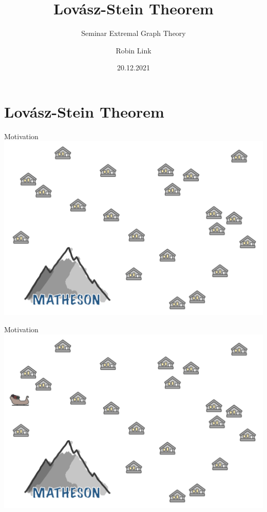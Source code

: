 \documentclass[10pt]{beamer}
\title{Lovász-Stein Theorem}
\subtitle{Seminar Extremal Graph Theory}
\date{20.12.2021}
\institute{Advisors: \newline Prof. Dr. Maria Axenovich \& Dr. Alexander Neal Riasanovsky}
\author{Robin Link}
\begin{document}
\maketitle

\section{Lovász-Stein Theorem}


\begin{frame}[fragile]{Motivation}
    \hspace*{-.25em}\includegraphics[width=\textwidth]{Images/Matheson/Matheson_01}
\end{frame}

\begin{frame}[fragile]{Motivation}
    \hspace*{-.25em}\includegraphics[width=\textwidth]{Images/Matheson/Matheson_02}
\end{frame}
\end{document}
